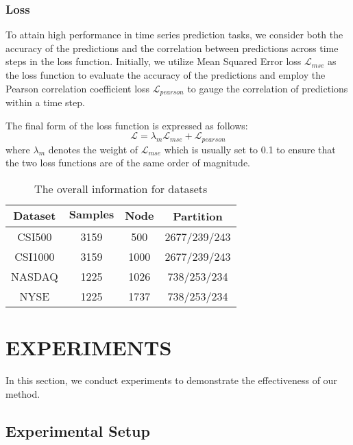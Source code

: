 \subsubsection{Loss}

To attain high performance in time series prediction tasks, we consider both the accuracy of the predictions and the correlation between predictions across time steps in the loss function. Initially, we utilize Mean Squared Error loss $\mathcal{L}_{mse}$ as the loss function to evaluate the accuracy of the predictions and employ the Pearson correlation coefficient loss $\mathcal{L}_{pearson}$ to gauge the correlation of predictions within a time step.

The final form of the loss function is expressed as follows:
\begin{equation}\mathcal{L}=\lambda_{m}\mathcal{L}_{mse}+\mathcal{L}_{pearson}\end{equation}
where $\lambda_m$ denotes the weight of $\mathcal{L}_{mse}$ which is usually set to 0.1 to ensure that the two loss functions are of the same order of magnitude.

\begin{table}[htb]   
    \centering
    \small
    \setlength{\tabcolsep}{1mm}
{

    \begin{tabular}{c|c|c|c}
        \hline
        $\textbf{Dataset}$ & $\textbf{Samples}$ & $\textbf{Node}$ & \textbf{ Partition}\\
        \hline
        CSI500& 3159 & 500 & 2677/239/243\\ 
        CSI1000& 3159 & 1000 &  2677/239/243\\ 
        NASDAQ& 1225 & 1026 &  738/253/234\\ 
        NYSE& 1225 & 1737 &  738/253/234\\ 
        \hline
    \end{tabular}
    }
    \caption{The overall information for datasets}
    \label{tab:dataset}
    
    
\end{table}

\section{EXPERIMENTS}
In this section, we conduct experiments to demonstrate the effectiveness of our method. 
\subsection{Experimental Setup}

